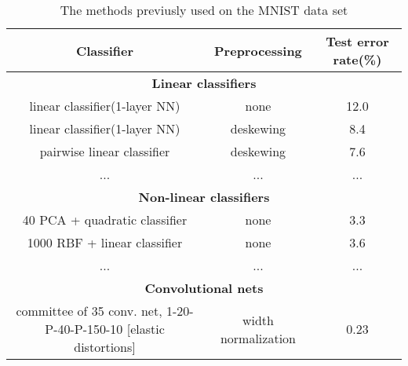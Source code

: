\begin{table}[htb!]
    \centering
    \resizebox{1\textwidth}{!}
    {
        \begin{tabular}{|c|c|c|}
            \hline
            Classifier                                                          & Preprocessing       & Test error rate(\%) \\
            \hline
            \multicolumn{3}{|c|}{\textbf{Linear classifiers}}                                                               \\
            \hline
            linear classifier(1-layer NN)                                       & none                & 12.0                \\
            linear classifier(1-layer NN)                                       & deskewing           & 8.4                 \\
            pairwise linear classifier                                          & deskewing           & 7.6                 \\
            \hline
            ...                                                                 & ...                 & ...                 \\
            \hline
            \multicolumn{3}{|c|}{\textbf{Non-linear classifiers}}                                                           \\
            \hline
            40 PCA + quadratic classifier                                       & none                & 3.3                 \\
            1000 RBF + linear classifier                                        & none                & 3.6                 \\
            \hline
            ...                                                                 & ...                 & ...                 \\
            \hline
            \multicolumn{3}{|c|}{\textbf{Convolutional nets}}                                                               \\
            \hline
            committee of 35 conv. net, 1-20-P-40-P-150-10 [elastic distortions] & width normalization & 0.23                \\
            \hline
        \end{tabular}
    }
    \caption{The methods previusly used on the MNIST data set}
    \label{tab:method-MNIST}
\end{table}


